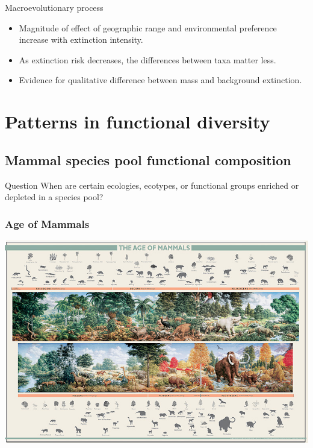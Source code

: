 \documentclass{beamer}
\begin{document}
\begin{frame}
  \begin{alertblock}{Macroevolutionary process}
    \begin{itemize}
      \item Magnitude of effect of geographic range and environmental preference increase with extinction intensity.
      \item As extinction risk decreases, the differences between taxa matter less.
      \item Evidence for qualitative difference between mass and background extinction.
    \end{itemize}
  \end{alertblock}
\end{frame}



\section{Patterns in functional diversity}

\begingroup
\AtBeginSubsection{}

\subsection{Mammal species pool functional composition}

\begin{frame}
  \begin{alertblock}{Question}
    When are certain ecologies, ecotypes, or functional groups enriched or depleted in a species pool?
  \end{alertblock}
\end{frame}

\begin{frame}
  \frametitle{Age of Mammals}
  \begin{center}
    \includegraphics[width = \textwidth,height = 0.8\textheight,keepaspectratio = true]{figure/aom}
  \end{center}
\end{frame}
\end{document}
